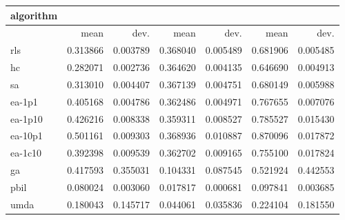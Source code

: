 \begin{tabular}{@{}l*{6}{>{{}}N{1}{2}}@{}}
\toprule
{algorithm} &  &  &  \\
\midrule
& {mean} & {dev.} & {mean} & {dev.} & {mean} & {dev.} \\
\midrule
rls & 0.313866 & 0.003789 & 0.368040 & 0.005489 & 0.681906 & 0.005485 \\
 hc & 0.282071 & 0.002736 & 0.364620 & 0.004135 & 0.646690 & 0.004913 \\
 sa & 0.313010 & 0.004407 & 0.367139 & 0.004751 & 0.680149 & 0.005988 \\
 ea-1p1 & 0.405168 & 0.004786 & 0.362486 & 0.004971 & 0.767655 & 0.007076 \\
 ea-1p10 & 0.426216 & 0.008338 & 0.359311 & 0.008527 & 0.785527 & 0.015430 \\
 ea-10p1 & 0.501161 & 0.009303 & 0.368936 & 0.010887 & 0.870096 & 0.017872 \\
 ea-1c10 & 0.392398 & 0.009539 & 0.362702 & 0.009165 & 0.755100 & 0.017824 \\
 ga & 0.417593 & 0.355031 & 0.104331 & 0.087545 & 0.521924 & 0.442553 \\
 pbil & 0.080024 & 0.003060 & 0.017817 & 0.000681 & 0.097841 & 0.003685 \\
 umda & 0.180043 & 0.145717 & 0.044061 & 0.035836 & 0.224104 & 0.181550 \\
 \bottomrule
\end{tabular}
